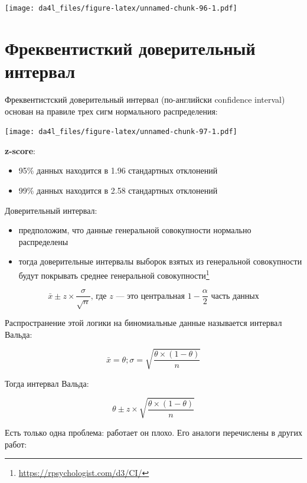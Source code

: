 \documentclass[
]{book}
\providecommand{\tightlist}{%
  \setlength{\itemsep}{0pt}\setlength{\parskip}{0pt}}
\renewcommand{\href}[2]{#2\footnote{\url{#1}}}
\begin{document}
\texttt{[image: da4l\_files/figure-latex/unnamed-chunk-96-1.pdf]}

\hypertarget{ux444ux440ux435ux43aux432ux435ux43dux442ux438ux441ux442ux43aux438ux439-ux434ux43eux432ux435ux440ux438ux442ux435ux43bux44cux43dux44bux439-ux438ux43dux442ux435ux440ux432ux430ux43b}{%
\section{Фреквентисткий доверительный интервал}\label{ux444ux440ux435ux43aux432ux435ux43dux442ux438ux441ux442ux43aux438ux439-ux434ux43eux432ux435ux440ux438ux442ux435ux43bux44cux43dux44bux439-ux438ux43dux442ux435ux440ux432ux430ux43b}}

Фреквентистский доверительный интервал (по-английски confidence interval) основан на правиле трех сигм нормального распределения:

\texttt{[image: da4l\_files/figure-latex/unnamed-chunk-97-1.pdf]}

\textbf{z-score}:

\begin{itemize}
\tightlist
\item
  95\% данных находится в 1.96 стандартных отклонений
\item
  99\% данных находится в 2.58 стандартных отклонений
\end{itemize}

Доверительный интервал:

\begin{itemize}
\tightlist
\item
  предположим, что данные генеральной совокупности нормально распределены
\item
  тогда доверительные интервалы выборок взятых из генеральной совокупности будут \href{https://rpsychologist.com/d3/CI/}{покрывать среднее генеральной совокупности}
\end{itemize}

\[\bar{x} \pm z \times \frac{\sigma}{\sqrt{n}}\text{, где } z \text{ — это центральная } 1 - \frac{\alpha}{2} \text{ часть данных}\]

Распространение этой логики на биномиальные данные называется интервал Вальда:

\[\bar{x} = \theta; \sigma = \sqrt{\frac{\theta\times(1-\theta)}{n}}\]

Тогда интервал Вальда:

\[\theta \pm  z\times\sqrt{\frac{\theta\times(1-\theta)} {n}}\]

Есть только одна проблема: работает он плохо. Его аналоги перечислены в других работ:
\end{document}
